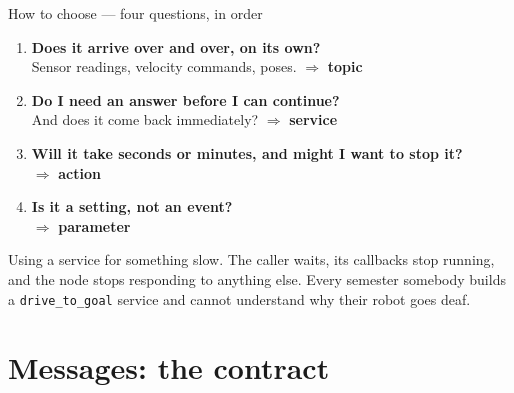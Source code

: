 \documentclass[aspectratio=169]{beamer}
\begin{document}
\begin{frame}{How to choose --- four questions, in order}
  \small
  \begin{enumerate}
    \item \textbf{Does it arrive over and over, on its own?}\\
          {\footnotesize Sensor readings, velocity commands, poses. $\Rightarrow$ \textbf{topic}}
    \item \textbf{Do I need an answer before I can continue?}\\
          {\footnotesize And does it come back immediately? $\Rightarrow$ \textbf{service}}
    \item \textbf{Will it take seconds or minutes, and might I want to stop it?}\\
          {\footnotesize $\Rightarrow$ \textbf{action}}
    \item \textbf{Is it a setting, not an event?}\\
          {\footnotesize $\Rightarrow$ \textbf{parameter}}
  \end{enumerate}

  \vspace{0.6em}
  \begin{underhood}
    \footnotesize
    Using a service for something slow. The caller waits, its callbacks stop running, and the
    node stops responding to anything else. Every semester somebody builds a
    \texttt{drive\_to\_goal} service and cannot understand why their robot goes deaf.
  \end{underhood}
\end{frame}

\section{Messages: the contract}
\end{document}
